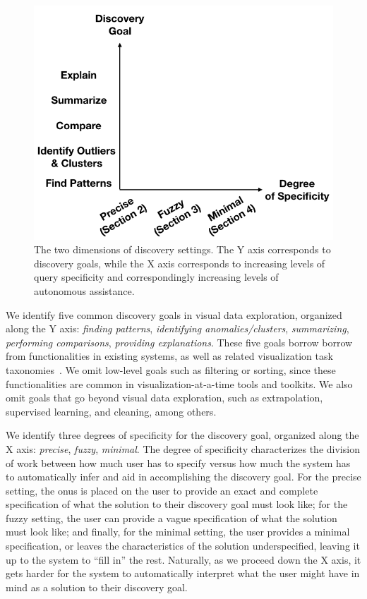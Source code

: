 \begin{figure}
\centering
\includegraphics[width=\linewidth]{figures/dimensions_cropped.png}
\vspace{-10pt}
\caption{The two dimensions of discovery settings. The Y axis corresponds to discovery goals, while the X axis corresponds to increasing levels of query specificity and correspondingly increasing levels of autonomous assistance.}\label{fig:dimensions}
\vspace{-10pt}
\end{figure}

\par
 We identify five 
common discovery goals in visual data exploration, organized
along the Y axis:
{\em finding patterns}, {\em identifying anomalies/clusters}, {\em summarizing}, 
{\em performing comparisons}, {\em providing explanations}.
These five goals borrow borrow from functionalities in existing
systems, as well as related visualization task taxonomies~\cite{Heer2012,Amar2005}.
We omit low-level goals such as filtering or sorting, since
these functionalities are common in 
visualization-at-a-time tools and toolkits.
We also omit goals that go beyond visual data exploration,
such as extrapolation, supervised learning, and cleaning, among others. 

\par 
 We identify three degrees of specificity
for the discovery goal, organized along the X axis:
{\em precise}, {\em fuzzy}, {\em minimal}.
The degree of specificity characterizes the division
of work between how much user has to specify
versus how much the system has to automatically
infer and aid in accomplishing the discovery goal. 
For the precise setting, the onus is placed on the user
to provide an exact and complete specification of 
what the solution to their discovery
goal must look like;
for the fuzzy setting, the user can provide
a vague specification of what the solution must look like;
and finally, for the minimal setting,
the user provides a minimal specification, or
leaves the characteristics of the solution underspecified,
leaving it up to the system to ``fill in'' the rest.
Naturally, as we proceed down the X axis,
it gets harder for the system to automatically
interpret what the user might have in mind as a solution
to their discovery goal.

